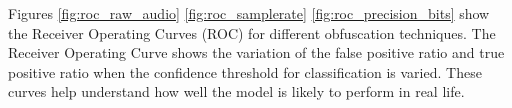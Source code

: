 Figures \ref{fig:roc_raw_audio} \ref{fig:roc_samplerate} \ref{fig:roc_precision_bits} show the Receiver Operating Curves (ROC) for different obfuscation techniques.
 The Receiver Operating Curve shows the variation of the false positive ratio and true positive ratio when the confidence threshold for classification is varied.
 These curves help understand how well the model is likely to perform in real life.




